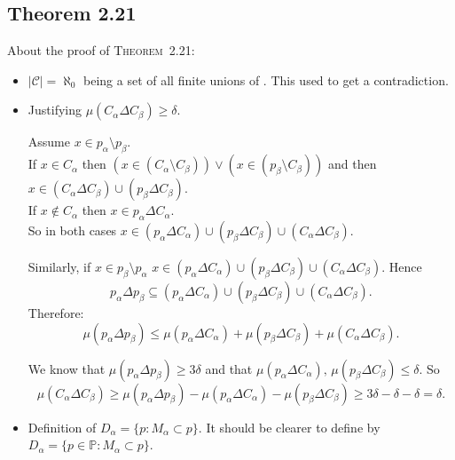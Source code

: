 \subsection{Theorem 2.21}

About the proof of \textsc{Theorem}~2.21:
\begin{itemize}
\item \(|\mathscr{C}|=\aleph_0\) being a set of all finite unions of \scrB.
  This used to get a contradiction.
\item Justifying \(\mu(C_\alpha \Delta C_\beta) \geq \delta\).

  Assume \(x\in p_\alpha \setminus p_\beta\).\\
  If \(x\in C_\alpha\) then 
  \((x \in (C_\alpha \setminus C_\beta))\lor(x\in (p_\beta \setminus C_\beta))\)
  and then \(x\in (C_\alpha \Delta C_\beta) \cup (p_\beta \Delta C_\beta)\).
  \\
  If \(x\notin C_\alpha\) then \(x \in p_\alpha \Delta C_\alpha\).\\
  So in both cases 
    \(x \in (p_\alpha \Delta C_\alpha) \cup (p_\beta \Delta C_\beta) 
      \cup  (C_\alpha \Delta C_\beta)\).

  Similarly, if \(x\in p_\beta \setminus p_\alpha\)
    \(x \in (p_\alpha \Delta C_\alpha) \cup (p_\beta \Delta C_\beta) 
      \cup  (C_\alpha \Delta C_\beta)\). Hence
  \begin{equation*}
    p_\alpha \Delta p_\beta \subseteq
    (p_\alpha \Delta C_\alpha) \cup (p_\beta \Delta C_\beta) 
      \cup  (C_\alpha \Delta C_\beta).
  \end{equation*}
  Therefore:
  \begin{equation*}
    \mu(p_\alpha \Delta p_\beta) \leq
    \mu(p_\alpha \Delta C_\alpha) + \mu(p_\beta \Delta C_\beta) 
      + \mu(C_\alpha \Delta C_\beta).
  \end{equation*}

  We know that \(\mu(p_\alpha \Delta p_\beta) \geq 3\delta\)
  and that 
  \(\mu(p_\alpha \Delta C_\alpha),\,\mu(p_\beta \Delta C_\beta) \leq \delta\).
  So
  \begin{equation*}
  \mu(C_\alpha \Delta C_\beta) \geq
    \mu(p_\alpha \Delta p_\beta)
      - \mu(p_\alpha \Delta C_\alpha) - \mu(p_\beta \Delta C_\beta) 
  \geq 3\delta - \delta - \delta = \delta.
  \end{equation*}

\item Definition of \(D_\alpha = \{p: M_\alpha \subset p\}\).
  It should be clearer to define by 
  \(D_\alpha = \{p\in\mathbb{P}: M_\alpha \subset p\}\).


\end{itemize}
